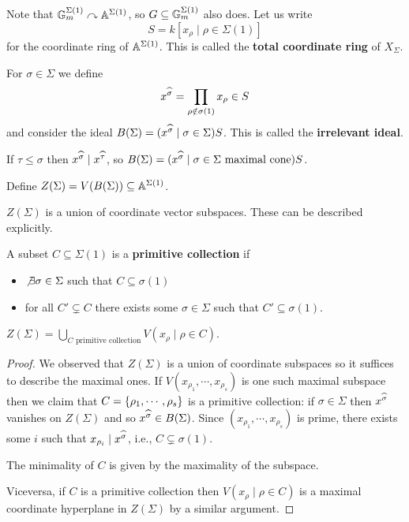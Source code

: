 Note that $\mathbb{G}_m^{\Sigma(1)}\curvearrowright\mathbb{A}^{\Sigma(1)}$, so $G\subseteq\mathbb{G}_m^{\Sigma(1)}$ also does. Let us write
\[S=k[x_\rho\mid \rho\in \Sigma(1)]\]
for the coordinate ring of $\mathbb{A}^{\Sigma(1)}$. This is called the \textbf{total coordinate ring} of $X_\Sigma$.


For $\sigma\in \Sigma$ we define
\[x^{\widehat{\sigma}}=\prod_{\rho\notin \sigma(1)}x_\rho\in S\]
and consider the ideal $B(\Sigma)=(x^{\widehat{\sigma}}\mid \sigma\in \Sigma)S$. This is called the \textbf{irrelevant ideal}.

\begin{remark}
If $\tau\leq \sigma$ then $x^{\widehat{\sigma}}\mid x^{\widehat{\tau}}$, so $B(\Sigma)=(x^{\widehat{\sigma}}\mid \sigma\in \Sigma\text{ maximal cone})S$.
\end{remark}


Define $Z(\Sigma)=V(B(\Sigma))\subseteq \mathbb{A}^{\Sigma(1)}$.

\begin{remark}
$Z(\Sigma)$ is a union of coordinate vector subspaces. These can be described explicitly.
\end{remark}

\begin{definition}[]
A subset $C\subseteq \Sigma(1)$ is a \textbf{primitive collection} if
\begin{itemize}
\item $\not\exists\sigma\in \Sigma$ such that $C\subseteq \sigma(1)$
\item for all $C'\subsetneq C$ there exists some $\sigma\in \Sigma$ such that $C'\subseteq \sigma(1)$.
\end{itemize}
\end{definition}



\begin{proposition}[]
$Z(\Sigma)=\bigcup_{C\text{ primitive collection}}V(x_\rho\mid \rho\in C)$.
\end{proposition}
\begin{proof}
We observed that $Z(\Sigma)$ is a union of coordinate subspaces so it suffices to describe the maximal ones. If $V(x_{\rho_1},\cdots, x_{\rho_s})$ is one such maximal subspace then we claim that $C=\left\{{\rho_1,\cdots, \rho_s}\right\}$ is a primitive collection: if $\sigma\in \Sigma$ then $x^{\widehat{\sigma}}$ vanishes on $Z(\Sigma)$ and so $x^{\widehat{\sigma}}\in B(\Sigma)$. Since $(x_{\rho_1},\cdots, x_{\rho_s})$ is prime, there exists some $i$ such that $x_{\rho_i}\mid x^{\widehat{\sigma}}$, i.e., $C\subsetneq \sigma(1)$.

The minimality of $C$ is given by the maximality of the subspace.


Viceversa, if $C$ is a primitive collection then $V(x_\rho\mid \rho\in C)$ is a maximal coordinate hyperplane in $Z(\Sigma)$ by a similar argument.
\end{proof}


